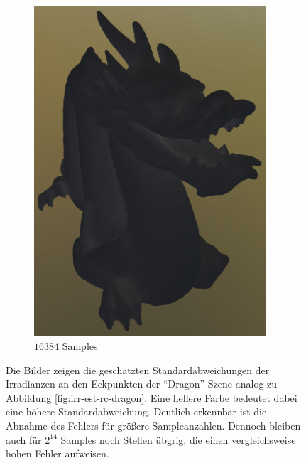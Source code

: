 \begin{figure}[h]
\begin{subfigure}[b]{0.33\textwidth}
				\includegraphics[width=0.95\textwidth]{pic/irr_est-rc-dragon2-s16384-err.png}
				\caption{$16384$ Samples}
			\end{subfigure}
			\caption[Fehler der Vertex-Irradiance-Map anhand der \enquote{Dragon}-Szene]{Die Bilder zeigen die geschätzten Standardabweichungen der Irradianzen an den Eckpunkten der \enquote{Dragon}-Szene analog zu Abbildung \ref{fig:irr-est-rc-dragon}. Eine hellere Farbe bedeutet dabei eine höhere Standardabweichung. Deutlich erkennbar ist die Abnahme des Fehlers für größere Sampleanzahlen. Dennoch bleiben auch für $2^{14}$ Samples noch Stellen übgrig, die einen vergleichsweise hohen Fehler aufweisen.}
			\label{fig:irr-est-rc-dragon-err}
		\end{figure}

